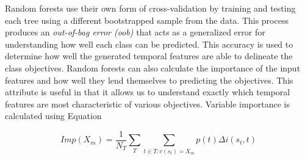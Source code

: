 Random forests use their own form of cross-validation by training and testing each tree using a different bootstrapped sample from the data. This process produces an \emph{out-of-bag error (oob)} that acts as a generalized error for understanding how well each class can be predicted. This accuracy is used to determine how well the generated temporal features are able to delineate the class objectives. Random forests can also calculate the importance of the input features and how well they lend themselves to predicting the objectives. This attribute is useful in that it allows us to understand exactly which temporal features are most characteristic of various objectives. Variable importance is calculated using Equation

\begin{equation}
Imp(X_m) = \frac{1}{N_T}\sum\limits_T\sum\limits_{t\in T:v(s_t)=X_m} p(t) \Delta i (s_t, t)
\label{eq:varimportance}
\end{equation}

